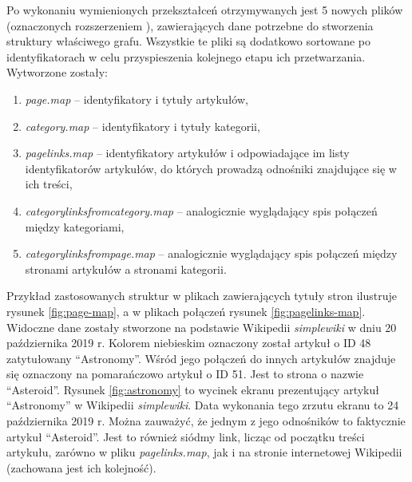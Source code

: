 Po wykonaniu wymienionych przekształceń otrzymywanych jest 5 nowych plików (oznaczonych rozszerzeniem ), zawierających dane potrzebne do stworzenia struktury właściwego grafu. Wszystkie te pliki są dodatkowo sortowane po identyfikatorach w celu przyspieszenia kolejnego etapu ich przetwarzania. Wytworzone zostały:

\begin{enumerate}[label=\textbullet]
    \setlength\itemsep{1.1em}
    \item \textit{page.map} – identyfikatory i tytuły artykułów,
    \item \textit{category.map} – identyfikatory i tytuły kategorii,
    \item \textit{pagelinks.map} – identyfikatory artykułów i odpowiadające im listy identyfikatorów artykułów, do których prowadzą odnośniki znajdujące się w ich treści,
    \item \textit{categorylinksfromcategory.map} – analogicznie wyglądający spis połączeń między kategoriami,
    \item \textit{categorylinksfrompage.map} – analogicznie wyglądający spis połączeń między stronami artykułów a stronami kategorii.
\end{enumerate}

Przykład zastosowanych struktur w plikach zawierających tytuły stron ilustruje rysunek \ref{fig:page-map}, a w plikach połączeń rysunek \ref{fig:pagelinks-map}. Widoczne dane zostały stworzone na podstawie Wikipedii \textit{simplewiki} w dniu 20 października 2019 r. Kolorem niebieskim oznaczony został artykuł o ID 48 zatytułowany ``Astronomy''. Wśród jego połączeń do innych artykułów znajduje się oznaczony na pomarańczowo artykuł o ID 51. Jest to strona o nazwie ``Asteroid''. Rysunek \ref{fig:astronomy} to wycinek ekranu prezentujący artykuł ``Astronomy'' w Wikipedii \textit{simplewiki}. Data wykonania tego zrzutu ekranu to 24 października 2019 r. Można zauważyć, że jednym z jego odnośników to faktycznie artykuł ``Asteroid''. Jest to również siódmy link, licząc od początku treści artykułu, zarówno w pliku \textit{pagelinks.map}, jak i na stronie internetowej Wikipedii (zachowana jest ich kolejność).




